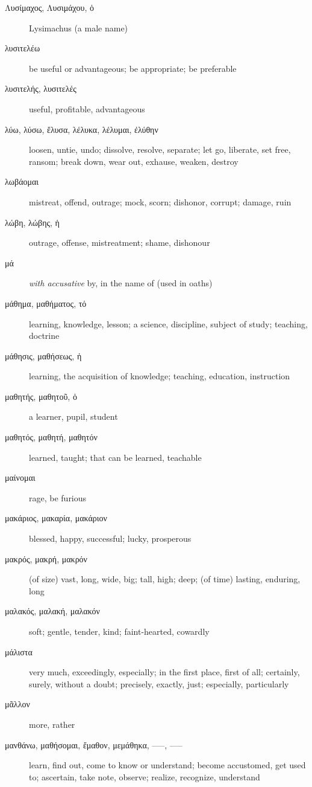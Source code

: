 \documentclass[12pt,letterpaper]{article}
\begin{document}
\begin{description}
    \item[\textgreek{Λυσίμαχος, Λυσιμάχου, ὁ}] Lysimachus (a male name)
    \item[\textgreek{λυσιτελέω}] be useful or advantageous; be appropriate; be preferable
    \item[\textgreek{λυσιτελής, λυσιτελές}] useful, profitable, advantageous
    \item[\textgreek{λύω, λύσω, ἔλυσα, λέλυκα, λέλυμαι, ἐλύθην}] \marginnote{*}loosen, untie, undo; dissolve, resolve, separate; let go, liberate, set free, ransom; break down, wear out, exhause, weaken, destroy
    \item[\textgreek{λωβάομαι}] mistreat, offend, outrage; mock, scorn; dishonor, corrupt; damage, ruin
    \item[\textgreek{λώβη, λώβης, ἡ}] outrage, offense, mistreatment; shame, dishonour
    \item[\textgreek{μά}] \textit{with accusative} by, in the name of (used in oaths)
    \item[\textgreek{μάθημα, μαθήματος, τό}] learning, knowledge, lesson; a science, discipline, subject of study; teaching, doctrine
    \item[\textgreek{μάθησις, μαθήσεως, ἡ}] learning, the acquisition of knowledge; teaching, education, instruction
    \item[\textgreek{μαθητής, μαθητοῦ, ὁ}] a learner, pupil, student
    \item[\textgreek{μαθητός, μαθητή, μαθητόν}] learned, taught; that can be learned, teachable
    \item[\textgreek{μαίνομαι}] rage, be furious
    \item[\textgreek{μακάριος, μακαρία, μακάριον}] blessed, happy, successful; lucky, prosperous
    \item[\textgreek{μακρός, μακρή, μακρόν}] \marginnote{*}(of size) vast, long, wide, big; tall, high; deep; (of time) lasting, enduring, long
    \item[\textgreek{μαλακός, μαλακή, μαλακόν}] soft; gentle, tender, kind; faint-hearted, cowardly
    \item[\textgreek{μάλιστα}] \marginnote{*}very much, exceedingly, especially; in the first place, first of all; certainly, surely, without a doubt; precisely, exactly, just; especially, particularly
    \item[\textgreek{μᾶλλον}] \marginnote{*}more, rather
    \item[\textgreek{μανθάνω, μαθήσομαι, ἔμαθον, μεμάθηκα, –––, –––}] \marginnote{*}learn, find out, come to know or understand; become accustomed, get used to; ascertain, take note, observe; realize, recognize, understand

\end{description}
\end{document}
